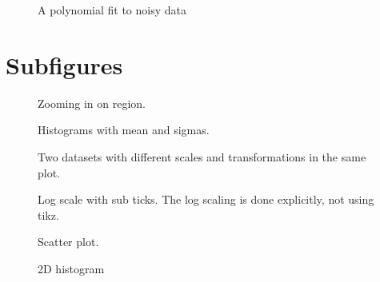 \documentclass{article}
\begin{document}
\begin{figure}[H]
  \centering
  
  \caption{A polynomial fit to noisy data}
\end{figure}

\section{Subfigures}
\label{sec:subfig}

\begin{figure}[H]
  \centering
  
  \caption{ Zooming in on region. }
\end{figure}

\begin{figure}[H]
  \centering
  
  \caption{ Histograms with mean and sigmas.}
\end{figure}

\begin{figure}[H]
  \centering
  
  \caption{ Two datasets with different scales and transformations in the same plot.}
\end{figure}

\begin{figure}[H]
  \centering
  
  \caption{ Log scale with sub ticks. The log scaling is done explicitly, not using tikz.}
\end{figure}

\begin{figure}[H]
  \centering
  
  \caption{Scatter plot.}
\end{figure}

\begin{figure}[H]
  \centering
  
  \caption{ 2D histogram }
\end{figure}
\end{document}

